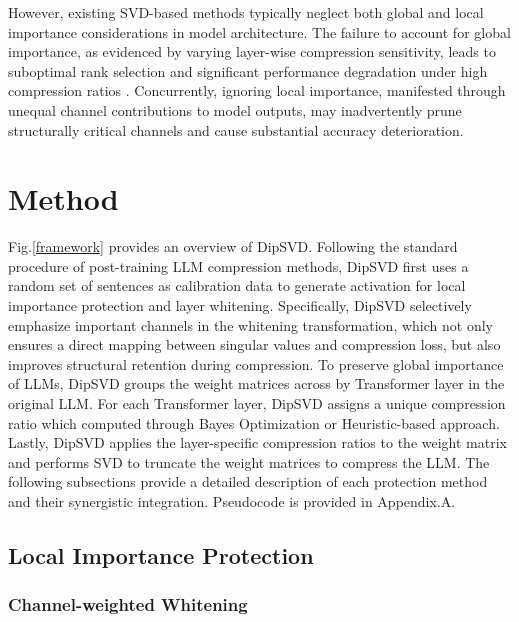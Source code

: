\documentclass[11pt]{article}
\begin{document}
However, existing SVD-based methods typically neglect both global and local importance considerations in model architecture. The failure to account for global importance, as evidenced by varying layer-wise compression sensitivity, leads to suboptimal rank selection and significant performance degradation under high compression ratios \citep{ding2025sliding}. Concurrently, ignoring local importance, manifested through unequal channel contributions to model outputs, may inadvertently prune structurally critical channels and cause substantial accuracy deterioration.

\section{Method}
Fig.\ref{framework} provides an overview of DipSVD. Following the standard procedure of post-training LLM compression methods, DipSVD first uses a random set of sentences as calibration data to generate activation for local importance protection and layer whitening. Specifically, DipSVD selectively emphasize important channels in the whitening transformation, which not only ensures a direct mapping between singular values and compression loss, but also improves structural retention during compression. To preserve global importance of LLMs, DipSVD groups the weight matrices across by Transformer layer in the original LLM. For each Transformer layer, DipSVD assigns a unique compression ratio which computed through Bayes Optimization or Heuristic-based approach. Lastly, DipSVD applies the layer-specific compression ratios to the weight matrix and performs SVD to truncate the weight matrices to compress the LLM. The following subsections provide a detailed description of each protection method and their synergistic integration. Pseudocode is provided in Appendix.A.

\subsection{Local Importance Protection}

\subsubsection{Channel-weighted Whitening}

\end{document}
